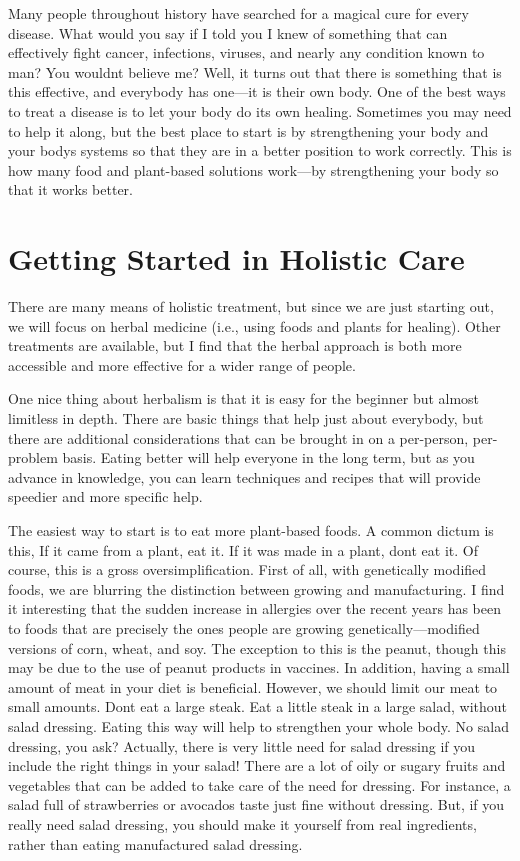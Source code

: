 Many people throughout history have searched for a magical cure for
every disease. What would you say if I told you I knew of something
that can effectively
fight cancer, infections, viruses, and nearly any condition
known to man?  You
wouldn{\textquotesingle}t believe me?  Well, it turns out that there is
something that is this effective, and everybody has one—it is their own
body. One of the best
ways to treat a
disease is to let
your body do its own healing. Sometimes you may need to help it along,
but the best place to start is by strengthening your body and your
body{\textquotesingle}s systems so that they are in a better position
to work correctly. This is how many food and plant-based solutions
work—by strengthening your body so that it works better.

\section{Getting Started in Holistic Care}

There are many means of holistic treatment,
but since we are just
starting out, we will focus on herbal medicine
(i.e., using foods
and plants for
healing). Other
treatments are available, but I find that the herbal approach is both
more accessible and more effective for a wider
range of people.

One nice thing about herbalism is that it is easy for the beginner but
almost limitless in depth. There are basic things that help just about
everybody, but there are additional considerations that can be brought
in on a per-person, per-problem basis. Eating better will help everyone
in the long term, but as you advance in knowledge, you can learn
techniques and recipes that will provide speedier and more specific
help. 

The easiest way to start is to eat more plant-based foods. A common
dictum is this, {\textquotedbl}If it came from a plant, eat it. If it
was made in a plant, don{\textquotesingle}t eat it.{\textquotedbl}  Of
course, this is a gross oversimplification. First of all, with
genetically modified foods, we are blurring the distinction between
growing and manufacturing. I find it interesting that the sudden
increase in allergies over the recent years has been to foods that are
precisely the ones people are growing genetically—modified versions of
corn, wheat, and soy. The exception to this is the peanut, though
this may be due to the use of peanut products in vaccines. In addition,
having a small amount of meat in your diet is beneficial. However, we
should limit our meat to small amounts. Don{\textquotesingle}t eat a
large steak. Eat a little steak in a large salad, without salad
dressing. Eating this way will help to strengthen your whole body.  No
salad dressing, you ask?  Actually, there is very little need for salad
dressing if you include the right things in your salad!  There are a
lot of oily or sugary fruits and vegetables that can be added to take
care of the need for dressing.  For instance, a salad full of
strawberries or avocados taste just fine without dressing.  But, if you
really need salad dressing, you should make it yourself from real
ingredients, rather than eating manufactured salad dressing.

